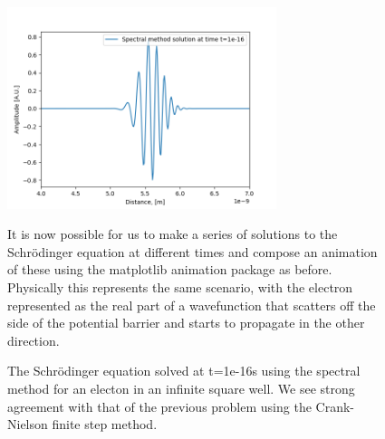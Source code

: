 \documentclass[11pt]{article}
\begin{document}
\begin{figure}[!htbp]
    \centering
    \includegraphics[width=0.7\textwidth]{Spectral Method.png}
    \caption{The Schrödinger equation solved at t=1e-16s using the spectral method for an electon in an infinite square well. We see strong agreement with that of the previous problem using the Crank-Nielson finite step method.}
    \label{spectral}

It is now possible for us to make a series of solutions to the Schrödinger equation at different times and compose an animation of these using the matplotlib animation package as before. Physically this represents the same scenario, with the electron represented as the real part of a wavefunction that scatters off the side of the potential barrier and starts to propagate in the other direction. 
\end{figure}
\end{document}
